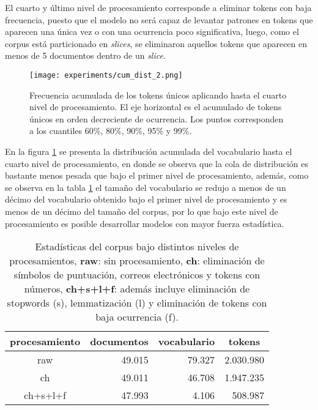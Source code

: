 \documentclass[letterpaper,12pt,oneside]{book} %
\begin{document}
El cuarto y último nivel de procesamiento corresponde a eliminar tokens con baja frecuencia, puesto que el modelo no será capaz de levantar patrones en tokens que aparecen una única vez o con una ocurrencia poco significativa, luego, como el corpus está particionado en \textit{slices}, se eliminaron aquellos tokens que aparecen en menos de 5 documentos dentro de un \textit{slice}.

\begin{figure}
    \centering
    \texttt{[image: experiments/cum\_dist\_2.png]}
    \caption{Frecuencia acumulada de los tokens únicos aplicando hasta el cuarto nivel de procesamiento. El eje horizontal es el acumulado de tokens únicos en orden decreciente de ocurrencia. Los puntos corresponden a los cuantiles 60\%, 80\%, 90\%, 95\% y 99\%.}
    \label{img:cum_dist2}
\end{figure}

En la figura \ref{img:cum_dist2} se presenta la distribución acumulada del vocabulario hasta el cuarto nivel de procesamiento, en donde se observa que la cola de distribución es bastante menos pesada que bajo el primer nivel de procesamiento, además, como se observa en la tabla \ref{table:processing_stats} el tamaño del vocabulario se redujo a menos de un décimo del vocabulario obtenido bajo el primer nivel de procesamiento y es menos de un décimo del tamaño del corpus, por lo que bajo este nivel de procesamiento es posible desarrollar modelos con mayor fuerza estadística.

\begin{table}[H]
    \begin{tabular}{|c|r|r|r|}
        \hline
        procesamiento & \multicolumn{1}{c|}{documentos} & \multicolumn{1}{c|}{vocabulario} & \multicolumn{1}{c|}{tokens} \\ \hline
        raw          & 49.015                           & 79.327                            & 2.030.980                     \\ \hline
        ch    & 49.011                           & 46.708                            & 1.947.235                     \\ \hline
        ch+s+l+f      & 47.993                           & 4.106                             & 508.987                      \\ \hline
        \end{tabular}
    \caption{Estadísticas del corpus bajo distintos niveles de procesamientos, \textbf{raw}: sin procesamiento, \textbf{ch}: eliminación de símbolos de puntuación, correos electrónicos y tokens con números, \textbf{ch+s+l+f}: además incluye eliminación de stopwords (s), lemmatización (l) y eliminación de tokens con baja ocurrencia (f).}
    \label{table:processing_stats}
\end{table}
\end{document}
